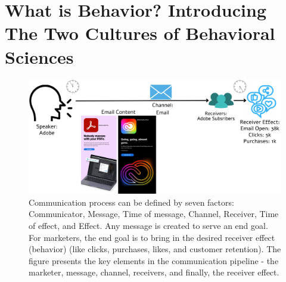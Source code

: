 
\chapter{What is Behavior? Introducing The Two Cultures of Behavioral Sciences}
\setcounter{page}{1}

\begin{figure}[!h]
  \centering
  \includegraphics[width=1.0\textwidth]{images/factors of communication.pdf}
  \caption{Communication process can be defined by seven factors: Communicator, Message, Time of message, Channel, Receiver, Time of effect, and Effect. Any message is created to serve an end goal. For marketers, the end goal is to bring in the desired receiver effect (behavior) (like clicks, purchases, likes, and customer retention). The figure presents the key elements in the communication pipeline - the marketer, message, channel, receivers, and finally, the receiver effect.   \label{fig:factors-of-communication}}
\end{figure}



